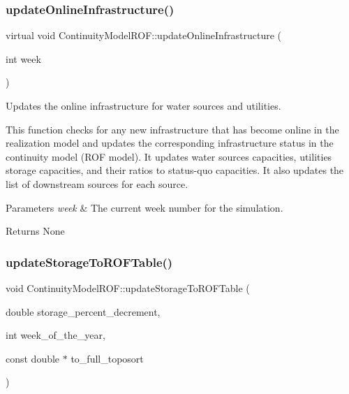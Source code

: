 \subsubsection{\texorpdfstring{update\+Online\+Infrastructure()}{updateOnlineInfrastructure()}}
{\footnotesize\ttfamily virtual void Continuity\+Model\+R\+O\+F\+::update\+Online\+Infrastructure (\begin{DoxyParamCaption}\item[{int}]{week }\end{DoxyParamCaption})\hspace{0.3cm}{\ttfamily [virtual]}}



Updates the online infrastructure for water sources and utilities. 

This function checks for any new infrastructure that has become online in the realization model and updates the corresponding infrastructure status in the continuity model (R\+OF model). It updates water sources\textquotesingle{} capacities, utilities\textquotesingle{} storage capacities, and their ratios to status-\/quo capacities. It also updates the list of downstream sources for each source.


\begin{DoxyParams}{Parameters}
{\em week} & The current week number for the simulation.\\
\hline
\end{DoxyParams}
\begin{DoxyReturn}{Returns}
None 
\end{DoxyReturn}
\mbox{\label{classContinuityModelROF_a28834584763c3aa27a6f0917aa68926f}} 
\subsubsection{\texorpdfstring{update\+Storage\+To\+R\+O\+F\+Table()}{updateStorageToROFTable()}}
{\footnotesize\ttfamily void Continuity\+Model\+R\+O\+F\+::update\+Storage\+To\+R\+O\+F\+Table (\begin{DoxyParamCaption}\item[{double}]{storage\+\_\+percent\+\_\+decrement,  }\item[{int}]{week\+\_\+of\+\_\+the\+\_\+year,  }\item[{const double $\ast$}]{to\+\_\+full\+\_\+toposort }\end{DoxyParamCaption})}



